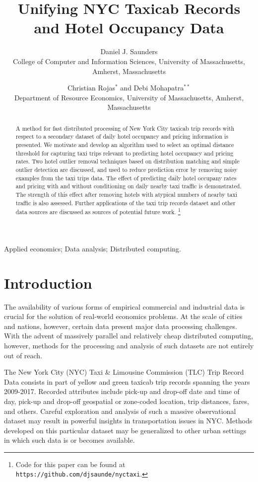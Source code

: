 \documentclass[useAMS, usenatbib]{biom}
\title{Unifying NYC Taxicab Records and Hotel Occupancy Data}
\author
{Daniel J. Saunders \emailx{djsaunde@cs.umass.edu} \\
College of Computer and Information Sciences, University of Massachusetts, Amherst, Massachusetts
\and
Christian Rojas$^{*}$\email{rojas@resecon.umass.edu} and
Debi Mohapatra$^{**}$\email{dmohapatra@umass.edu} \\
Department of Resource Economics, University of Massachusetts, 
Amherst, Massachusetts}
\newcommand\blfootnote[1]{%
  \begingroup
  \renewcommand\thefootnote{}\footnote{#1}%
  \addtocounter{footnote}{-1}%
  \endgroup
}
\begin{document}
\label{firstpage}

\begin{abstract}
A method for fast distributed processing of New York City taxicab trip records with respect to a secondary dataset of daily hotel occupancy and pricing information is presented. We motivate and develop an algorithm used to select an optimal distance threshold for capturing taxi trips relevant to predicting hotel occupancy and pricing rates. Two hotel outlier removal techniques based on distribution matching and simple outlier detection are discussed, and used to reduce prediction error by removing noisy examples from the taxi trips data. The effect of predicting daily hotel occupany rates and pricing with and without conditioning on daily nearby taxi traffic is demonstrated. The strength of this effect after removing hotels with atypical numbers of nearby taxi traffic is also assessed. Further applications of the taxi trip records dataset and other data sources are discussed as sources of potential future work. \blfootnote{Code for this paper can be found at \texttt{https://github.com/djsaunde/nyctaxi}.}
\end{abstract}

\begin{keywords}
Applied economics; Data analysis; Distributed computing.
\end{keywords}

\maketitle

\section{Introduction}
\label{s:intro}

The availability of various forms of empirical commercial and industrial data is crucial for the solution of real-world economics problems. At the scale of cities and nations, however, certain data present major data processing challenges. With the advent of massively parallel and relatively cheap distributed computing, however, methods for the processing and analysis of such datasets are not entirely out of reach.

The New York City (NYC) Taxi \& Limousine Commission (TLC) Trip Record Data consists in part of yellow and green taxicab trip records spanning the years 2009-2017. Recorded attributes include pick-up and drop-off date and time of day, pick-up and drop-off geospatial or zone-coded location, trip distances, fares, and others. Careful exploration and analysis of such a massive observational dataset may result in powerful insights in transportation issues in NYC. Methods developed on this particular dataset may be generalized to other urban settings in which such data is or becomes available.
\end{document}
